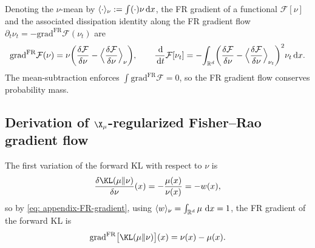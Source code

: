\documentclass{article}
\begin{document}
Denoting the $\nu$-mean by $\langle \cdot \rangle_\nu := \int( \cdot ) \nu \,\mathrm d x$, the FR gradient of a functional $\mathcal F[\nu]$ and the associated dissipation identity along the FR gradient flow $\partial_t\nu_t = -\mathrm{grad}^{\mathrm{FR}}\mathcal F(\nu_t)$ are
\begin{equation}
    \mathrm{grad}^{\mathrm{FR}}\mathcal F(\nu) = \nu\biggl(\frac{\delta\mathcal F}{\delta\nu} - \Big\langle\frac{\delta\mathcal F}{\delta\nu}\Big\rangle_\nu\biggr),
    \qquad
    \frac{\,\mathrm d}{\,\mathrm d t}\mathcal F[\nu_t] = -\!\int_{\mathbb R^d}\biggl(\frac{\delta\mathcal F}{\delta\nu} - \Big\langle\frac{\delta\mathcal F}{\delta\nu}\Big\rangle_{\nu_t}\biggr)^{2}\nu_t \,\mathrm d x.
    \label{eq: appendix-FR-gradient}
\end{equation}
The mean-subtraction enforces $\int\mathrm{grad}^{\mathrm{FR}}\mathcal F = 0$, so the FR gradient flow conserves probability mass.

\subsection{Derivation of \texorpdfstring{$\X_\mu$}{X-mu}-regularized Fisher--Rao gradient flow}
\label{subsec: appendix-FR-grad-calc}

The first variation of the forward KL with respect to $\nu$ is
\begin{equation}
    \frac{\delta \KL(\mu\|\nu)}{\delta \nu}(x) = -\frac{\mu(x)}{\nu(x)} = -w(x),
    \label{eq: appendix-var-KL}
\end{equation}
so by \eqref{eq: appendix-FR-gradient}, using $\langle w \rangle_\nu = \int_{\mathbb R^d} \mu \,\,\mathrm d x = 1$, the FR gradient of the forward KL is
\begin{equation}
    \mathrm{grad}^{\mathrm{FR}}\big[\KL(\mu\|\nu)\big](x) = \nu(x) - \mu(x).
    \label{eq: appendix-FR-grad-KL}
\end{equation}
\end{document}
